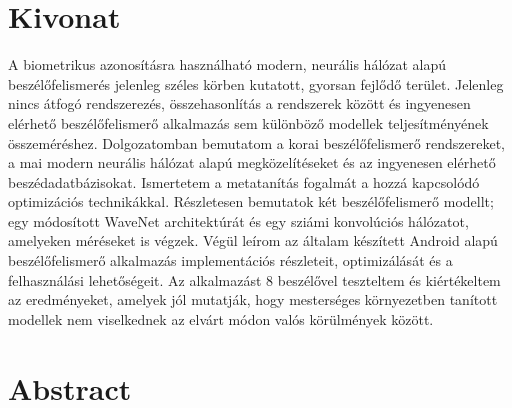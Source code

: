 \setcounter{page}{1}

\selecthungarian

\chapter*{Kivonat}

A biometrikus azonosításra használható modern, neurális hálózat alapú beszélőfelismerés jelenleg széles körben kutatott, gyorsan fejlődő terület. Jelenleg nincs átfogó rendszerezés, összehasonlítás a rendszerek között és ingyenesen elérhető beszélőfelismerő alkalmazás sem különböző modellek teljesítményének összeméréshez.
\newline
\newline
Dolgozatomban bemutatom a korai beszélőfelismerő rendszereket, a mai modern neurális hálózat alapú megközelítéseket és az ingyenesen elérhető beszédadatbázisokat. Ismertetem a metatanítás fogalmát a hozzá kapcsolódó optimizációs technikákkal. Részletesen bemutatok két beszélőfelismerő modellt; egy módosított WaveNet architektúrát és egy sziámi konvolúciós hálózatot, amelyeken méréseket is végzek.
\newline
\newline
Végül leírom az általam készített Android alapú beszélőfelismerő alkalmazás implementációs részleteit, optimizálását és a felhasználási lehetőségeit. Az alkalmazást 8 beszélővel teszteltem és kiértékeltem az eredményeket, amelyek jól mutatják, hogy mesterséges környezetben tanított modellek nem viselkednek az elvárt módon valós körülmények között.


\vfill
\selectenglish


\chapter*{Abstract}

